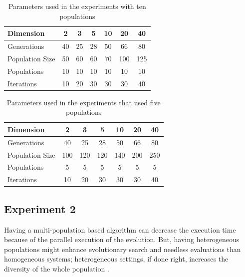 \documentclass[review]{elsarticle}
\begin{document}
\begin{table}
    \small
    \caption{Parameters used in the experiments with ten populations
    }
    \label{tab:params:10}
    \vspace{0.25cm}
    \centering
    \small
    \begin{tabular}{|l|c|c|c|c|c|c|}
      \hline
      Dimension        & 2  & 3  & 5  & 10 & 20  & 40  \\ \hline
      Generations      & 40 & 25 & 28 & 50 & 66  & 80  \\ \hline
      Population Size  & 50 & 60 & 60 & 70 & 100 & 125 \\ \hline
      Populations      & 10 & 10 & 10 & 10 & 10  & 10  \\ \hline
      Iterations       & 10 & 20 & 30 & 30 & 30  & 40  \\ \hline  
    \end{tabular}
\end{table}

\begin{table}
    \small
    \caption{Parameters used in the experiments that used five populations
    }
    \label{tab:params:5}
    \vspace{0.25cm}
    \centering
    \small
    \begin{tabular}{|l|c|c|c|c|c|c|}
      \hline
      Dimension        & 2  & 3  & 5  & 10 & 20  & 40  \\ \hline
      Generations      & 40 & 25 & 28 & 50 & 66  & 80  \\ \hline
      Population Size  & 100 & 120 & 120 & 140 & 200 & 250 \\ \hline
      Populations      & 5 & 5 & 5 & 5 & 5  & 5  \\ \hline
      Iterations       & 10 & 20 & 30 & 30 & 30  & 40  \\ \hline  
    \end{tabular}
\end{table}

% 

\subsection{Experiment 2}
\label{sec:exp2}

Having a multi-population based algorithm can decrease the execution time
because of the parallel execution of the evolution. But, having heterogeneous 
populations might enhance evolutionary search and needless
evaluations than homogeneous systems; heterogeneous settings, if
done right, increases the diversity of the whole population
\cite{araujo2008multikulti}.
\end{document}
